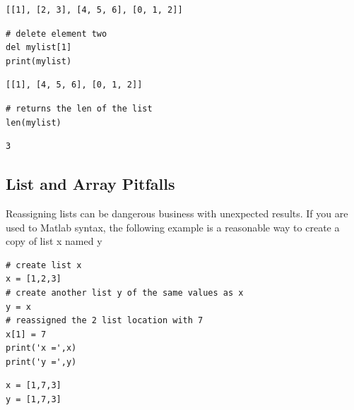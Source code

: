 \documentclass[%
oneside,                 %
final,                   %
10pt]{article}
\begin{document}
\begin{verbatim}
[[1], [2, 3], [4, 5, 6], [0, 1, 2]]
\end{verbatim}


\begin{verbatim}
# delete element two
del mylist[1]
print(mylist)
\end{verbatim}

\begin{verbatim}
[[1], [4, 5, 6], [0, 1, 2]]
\end{verbatim}


\begin{verbatim}
# returns the len of the list
len(mylist)
\end{verbatim}

\begin{verbatim}
3
\end{verbatim}

\subsection{List and Array Pitfalls}

Reassigning lists can be dangerous business with unexpected results. If you are used to Matlab syntax, the following example is a reasonable way to create a copy of list x named y

\begin{verbatim}
# create list x
x = [1,2,3]
# create another list y of the same values as x
y = x
# reassigned the 2 list location with 7
x[1] = 7
print('x =',x)
print('y =',y)
\end{verbatim}

\begin{verbatim}
x = [1,7,3]
y = [1,7,3]
\end{verbatim}
\end{document}
